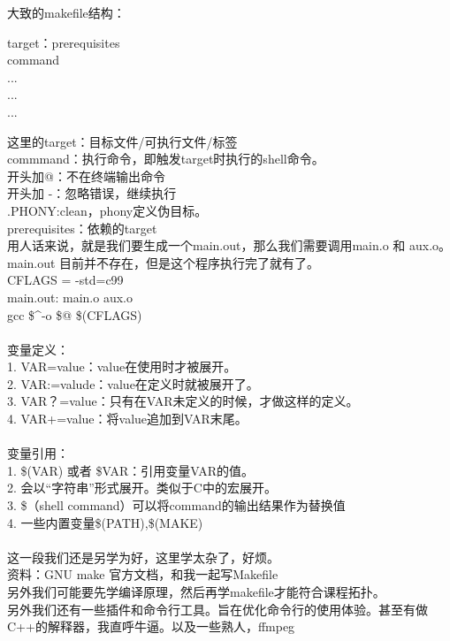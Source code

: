 \documentclass{article}
\begin{document}
大致的makefile结构：\\
\begin{center}
    target：prerequisites\\
    command\\
    ...\\
    ...\\
    ...\\
\end{center}
这里的target：目标文件/可执行文件/标签\\
commmand：执行命令，即触发target时执行的shell命令。\\
\hspace*{2em} 开头加@：不在终端输出命令\\
\hspace*{2em} 开头加 -：忽略错误，继续执行\\
.PHONY:clean，phony定义伪目标。\\
prerequisites：依赖的target\\

\noindent
用人话来说，就是我们要生成一个main.out，那么我们需要调用main.o 和 aux.o。main.out 目前并不存在，但是这个程序执行完了就有了。\\
CFLAGS = -std=c99\\
main.out: main.o aux.o\\
\hspace*{2em} gcc \quad \$\^ \quad -o \$@ \qquad \$(CFLAGS)\\
\\
变量定义：\\
1. VAR=value：value在使用时才被展开。\\
2. VAR:=valude：value在定义时就被展开了。\\
3. VAR？=value：只有在VAR未定义的时候，才做这样的定义。\\
4. VAR+=value：将value追加到VAR末尾。\\
\\
变量引用：\\
1. \$(VAR) 或者 \${VAR}：引用变量VAR的值。\\
2. 会以“字符串”形式展开。类似于C中的宏展开。\\
3. \$（shell command）可以将command的输出结果作为替换值\\
4. 一些内置变量\$(PATH),\$(MAKE)\\
\\
这一段我们还是另学为好，这里学太杂了，好烦。\\
资料：GNU make 官方文档，和我一起写Makefile\\
另外我们可能要先学编译原理，然后再学makefile才能符合课程拓扑。\\

另外我们还有一些插件和命令行工具。旨在优化命令行的使用体验。甚至有做C++的解释器，我直呼牛逼。以及一些熟人，ffmpeg\\
\end{document}
